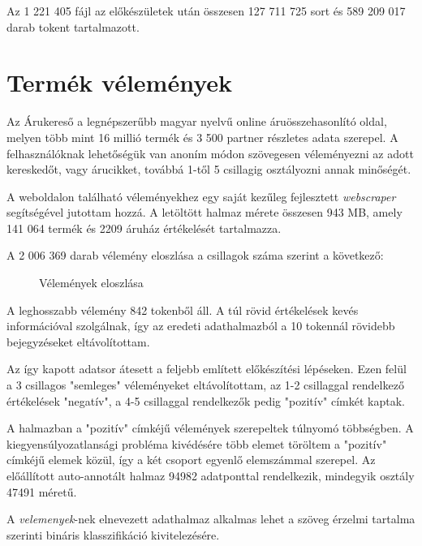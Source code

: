 Az 1 221 405 fájl az előkészületek után összesen 127 711 725 sort és 589 209 017 darab tokent tartalmazott.

\section{Termék vélemények}
Az Árukereső \cite{arukereso} a legnépszerűbb magyar nyelvű online áruösszehasonlító oldal, melyen több mint 16 millió termék és 3 500 partner részletes adata szerepel. A felhasználóknak lehetőségük van anoním módon szövegesen véleményezni az adott kereskedőt, vagy árucikket, továbbá 1-től 5 csillagig osztályozni annak minőségét.

A weboldalon található véleményekhez egy saját kezűleg fejlesztett \textit{webscraper} segítségével jutottam hozzá. A letöltött halmaz mérete összesen 943 MB, amely 141 064 termék és 2209 áruház értékelését tartalmazza. 

A 2 006 369 darab vélemény eloszlása a csillagok száma szerint a következő:

\begin{figure}[H]
	\centering
	\hspace{5pt}
	\caption{Vélemények eloszlása}
	\label{fig:arukereso}
\end{figure}

A leghosszabb vélemény 842 tokenből áll. A túl rövid értékelések kevés információval szolgálnak, így az eredeti adathalmazból a 10 tokennál rövidebb bejegyzéseket eltávolítottam.

Az így kapott adatsor átesett a feljebb említett előkészítési lépéseken. Ezen felül a 3 csillagos "semleges" véleményeket eltávolítottam, az 1-2 csillaggal rendelkező értékelések "negatív", a 4-5 csillaggal rendelkezők pedig "pozitív" címkét kaptak.

A halmazban a "pozitív" címkéjű vélemények szerepeltek túlnyomó többségben. A kiegyensúlyozatlansági probléma kivédésére több elemet töröltem a "pozitív" címkéjű elemek közül, így a két csoport egyenlő elemszámmal szerepel. Az előállított auto-annotált halmaz 94982 adatponttal rendelkezik, mindegyik osztály 47491 méretű. 

A \textit{velemenyek}-nek elnevezett adathalmaz alkalmas lehet a szöveg érzelmi tartalma szerinti bináris klasszifikáció kivitelezésére. 
